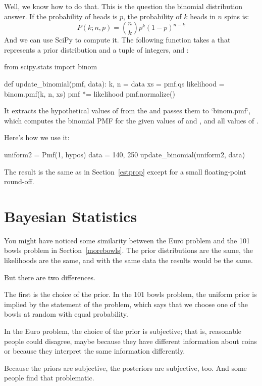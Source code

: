 \documentclass[12pt]{book}
\theoremstyle{exercise}
\begin{document}
Well, we know how to do that.  This is the question the binomial distribution answer.
If the probability of heads is $p$, the probability of $k$ heads in $n$ spins is:
%
\[ P(k; n, p) = \binom{n}{k} p^k (1-p)^{n-k} \]
%
And we can use SciPy to compute it.
The following function takes a  that represents a prior distribution and a tuple of integers,  and :

\begin{code}
from scipy.stats import binom

def update_binomial(pmf, data):
    k, n = data
    xs = pmf.qs
    likelihood = binom.pmf(k, n, xs)
    pmf *= likelihood
    pmf.normalize()
\end{code}

It extracts the hypothetical values of  from the  and passes them to `binom.pmf`, which computes the binomial PMF for the given values of  and , and all values of .

Here's how we use it:

\begin{code}
uniform2 = Pmf(1, hypos)
data = 140, 250
update_binomial(uniform2, data)
\end{code}

The result is the same as in Section~\ref{estprop} except for a small floating-point round-off.


\section{Bayesian Statistics}

You might have noticed some similarity between the Euro problem and the 101 bowls problem in Section~\ref{morebowls}.
The prior distributions are the same, the likelihoods are the same, and with the same data the results would be the same.

But there are two differences.

The first is the choice of the prior.
In the 101 bowls problem, the uniform prior is implied by the statement of the problem, which says that we choose one of the bowls at random with equal probability.

In the Euro problem, the choice of the prior is subjective; that is, reasonable people could disagree, maybe because they have different information about coins or because they interpret the same information differently.

Because the priors are subjective, the posteriors are subjective, too.
And some people find that problematic.
\end{document}
